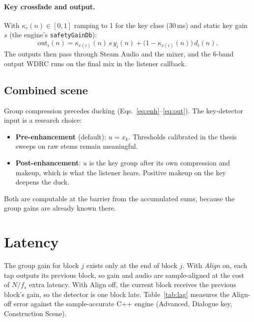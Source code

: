\documentclass[11pt]{article}
\newcommand{\code}[1]{\texttt{#1}}
\begin{document}
\paragraph{Key crossfade and output.}
With $\kappa_c(n)\in[0,1]$ ramping to 1 for the key class (30\,ms) and
static key gain $s$ (the engine's \code{safetyGainDb}):
\begin{equation}
  \mathrm{out}_i(n) = \kappa_{c(i)}(n)\, s\, y_i(n) + \bigl(1-\kappa_{c(i)}(n)\bigr)\, d_i(n).
  \label{eq:out}
\end{equation}
The outputs then pass through Steam Audio and the mixer, and the 6-band
output WDRC runs on the final mix in the listener callback.

\subsection{Combined scene}
\label{sec:combined}
Group compression precedes ducking (Eqs.~\ref{eq:enh}--\ref{eq:out}). The
key-detector input is a research choice:
\begin{itemize}[nosep]
  \item \textbf{Pre-enhancement} (default): $u = x_k$. Thresholds calibrated
        in the thesis sweeps on raw stems remain meaningful.
  \item \textbf{Post-enhancement}: $u$ is the key group after its own
        compression and makeup, which is what the listener hears. Positive
        makeup on the key deepens the duck.
\end{itemize}
Both are computable at the barrier from the accumulated sums, because the
group gains are already known there.

\section{Latency}
\label{sec:latency}

The group gain for block $j$ exists only at the end of block $j$. With
\emph{Align} on, each tap outputs its previous block, so gain and audio are
sample-aligned at the cost of $N/f_s$ extra latency. With Align off, the
current block receives the previous block's gain, so the detector is one block
late. Table~\ref{tab:lag} measures the Align-off error against the
sample-accurate C++ engine (Advanced, Dialogue key, Construction Scene).
\end{document}
